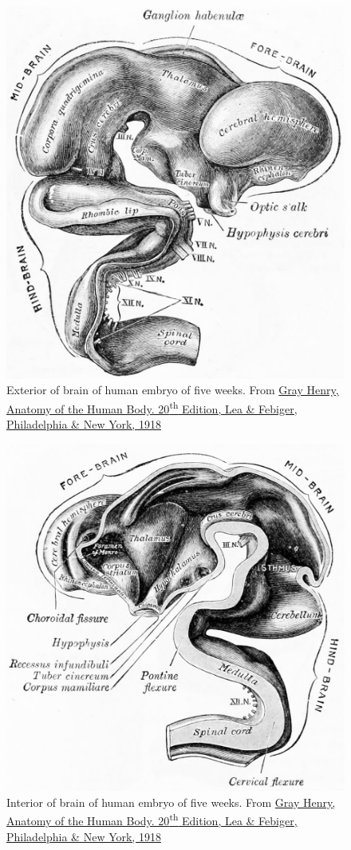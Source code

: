 \begin{figure}

{\centering \includegraphics[width=0.7\linewidth]{./figures/development/GrayAnat1918p741} 

}

\caption{Exterior of brain of human embryo of five weeks. From \href{https://archive.org/details/anatomyofhumanbo1918gray/page/n6/mode/2up}{Gray Henry, Anatomy of the Human Body. 20\textsuperscript{th} Edition, Lea \& Febiger, Philadelphia \& New York, 1918}}\label{fig:fivexterior}
\end{figure}



\begin{figure}

{\centering \includegraphics[width=0.7\linewidth]{./figures/development/GrayAnat1918p742} 

}

\caption{Interior of brain of human embryo of five weeks. From \href{https://archive.org/details/anatomyofhumanbo1918gray/page/n6/mode/2up}{Gray Henry, Anatomy of the Human Body. 20\textsuperscript{th} Edition, Lea \& Febiger, Philadelphia \& New York, 1918}}\label{fig:fiveinterior}
\end{figure}

